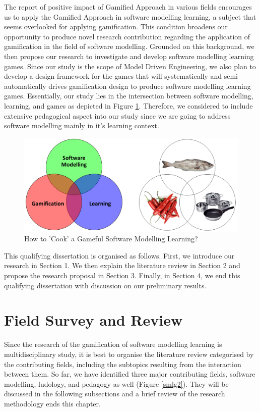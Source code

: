 \documentclass[12pt, a4paper]{report}
\begin{document}
The report of positive impact of Gamified Approach in various fields encourages us to apply the Gamified Approach in software modelling learning, a subject that seems overlooked for applying gamification. This condition broadens our opportunity to produce novel research contribution regarding the application of gamification in the field of software modelling. Grounded on this background, we then propose our research to investigate and develop software modelling learning games. Since our study is the scope of Model Driven Engineering, we also plan to develop a design framework for the games that will systematically and semi-automatically drives gamification design to produce software modelling learning games. Essentially, our study lies in the intersection between software modelling, learning, and games as depicted in Figure \ref{smlg}. Therefore, we considered to include extensive pedagogical aspect into our study since we are going to address software modelling mainly in it's learning context.    

\begin{figure}[ht]
\centering
\includegraphics[width=\textwidth]{smlg}
\caption{How to 'Cook' a Gameful Software Modelling Learning?}
\label{smlg}
\end{figure}

This qualifying dissertation is organised as follows. First, we introduce our research in Section 1. We then explain the literature review in Section 2 and propose the research proposal in Section 3. Finally, in Section 4, we end this qualifying dissertation with discussion on our preliminary results. 

\chapter{Field Survey and Review}

Since the research of the gamification of software modelling learning is multidisciplinary study, it is best to organise the literature review categorised by the contributing fields, including the subtopics resulting from the interaction between them. So far, we have identified three major contributing fields, software modelling, ludology, and pedagogy as well (Figure \ref{smlg2}). They will be discussed in the following subsections and a brief review of the research methodology ends this chapter.
\end{document}
